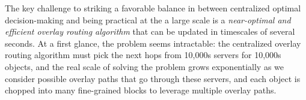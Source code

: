 
The key challenge to striking a favorable balance in \name between 
centralized optimal decision-making and being practical at the
a large scale is a {\em near-optimal and efficient overlay routing
algorithm} that can be updated in timescales of several seconds. 
At a first glance, the problem seems intractable: 
the centralized overlay routing algorithm must pick the next hops
from 10,000s servers for 10,000s objects, and the real scale of 
solving the problem grows exponentially as we consider possible 
overlay paths that go through these servers, and each object is 
chopped into many fine-grained blocks to leverage multiple overlay
paths.


%
%
%
%
%
%



